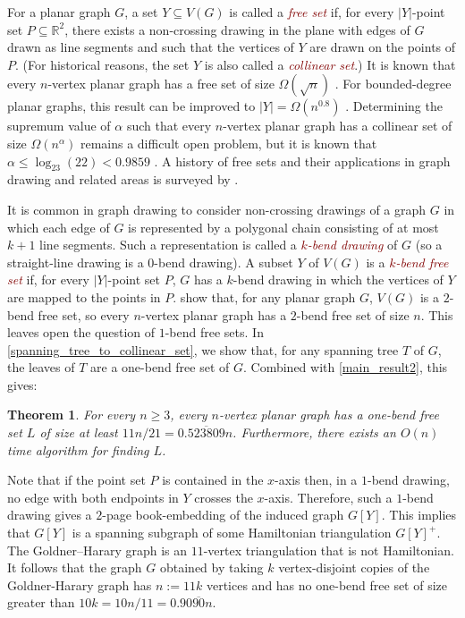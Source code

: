 \documentclass[11pt]{article}
\newcommand{\R}{\mathbb{R}}
\newtheorem{thm}{Theorem}
\newcommand{\defin}[1]{\emph{\textcolor{Maroon}{#1}}}
\theoremstyle{definition}
\begin{document}
For a planar graph $G$, a set $Y\subseteq V(G)$ is called a \defin{free set} if, for every $|Y|$-point set $P\subseteq\R^2$, there exists a non-crossing drawing in the plane with edges of $G$ drawn as line segments and such that the vertices of $Y$ are drawn on the points of $P$.  (For historical reasons, the set $Y$ is also called a \defin{collinear set}.)  It is known that every $n$-vertex planar graph has a free set of size $\Omega(\sqrt{n})$ \cite{bose.dujmovic:polynomial,dujmovic:utility,dujmovic.frati.ea:every}.
For bounded-degree planar graphs, this result can be improved to $|Y|=\Omega(n^{0.8})$ \cite{dujmovic.morin:dual}.  Determining the supremum value of $\alpha$ such that every $n$-vertex planar graph has a collinear set of size $\Omega(n^{\alpha})$ remains a difficult open problem, but it is known that $\alpha \le \log_{23}(22)<0.9859$ \cite{ravsky.verbitsky:collinear}. A history of free sets and their applications in graph drawing and related areas is surveyed by \citet{dujmovic.morin:free}.

It is common in graph drawing to consider non-crossing drawings of a graph $G$ in which each edge of $G$ is represented by a polygonal chain consisting of at most $k+1$ line segments.  Such a representation is called a \defin{$k$-bend drawing} of $G$ (so a straight-line drawing is a $0$-bend drawing). A subset $Y$ of $V(G)$ is a \defin{$k$-bend free set} if, for every $|Y|$-point set $P$,  $G$ has a $k$-bend drawing in which the vertices of $Y$ are mapped to the points in $P$. \citet{KaufmannWiese2002} show that, for any planar graph $G$, $V(G)$ is a $2$-bend free set, so every $n$-vertex planar graph has a $2$-bend free set of size $n$. This leaves open the question of $1$-bend free sets.  
In \cref{spanning_tree_to_collinear_set}, we show that, for any spanning tree $T$ of $G$, the leaves of $T$ are a one-bend free set of $G$.  Combined with \cref{main_result2}, this gives:

\begin{thm}\label{one_bend_collinear_thm}
  For every $n\ge 3$, every $n$-vertex planar graph has a one-bend free set $L$ of size at least $11n/21=0.\overline{523809}n$.  Furthermore, there exists an $O(n)$ time algorithm for finding $L$.
\end{thm}

Note that if the point set $P$ is contained in the $x$-axis then, in a $1$-bend drawing, no edge with both endpoints in $Y$ crosses the $x$-axis.  Therefore, such a $1$-bend drawing gives a $2$-page book-embedding of the induced graph $G[Y]$. This implies that $G[Y]$ is a spanning subgraph of some Hamiltonian triangulation $G[Y]^+$.  The Goldner–Harary graph is an $11$-vertex triangulation that is not Hamiltonian. It follows that the graph $G$ obtained by taking $k$ vertex-disjoint copies of the Goldner-Harary graph has $n:=11k$ vertices and has no one-bend free set of size greater than $10k=10n/11=0.90\overline{90}n$.
\end{document}
